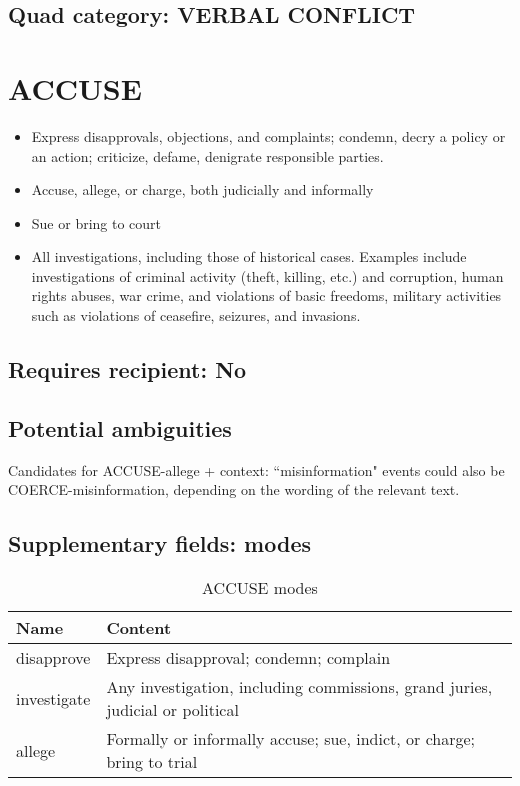 \documentclass[11pt]{report}
\newcommand{\plcat}[1]{\textsf{#1}}
\begin{document}
\subsection{Quad category: VERBAL CONFLICT}

\newpage


\section{ACCUSE}

\begin{itemize}
	\item Express disapprovals, objections, and complaints; condemn, decry a policy or an action; criticize, defame, denigrate responsible parties.
	\item Accuse, allege, or charge, both judicially and informally
	\item Sue or bring to court
	\item All investigations, including those of historical cases. Examples include investigations of  criminal activity (theft, killing, etc.) and corruption, human rights abuses, war crime, and violations of basic freedoms, military activities such as violations of ceasefire, seizures, and invasions.
\end{itemize}


\subsection{Requires recipient: No}

\subsection{Potential ambiguities}

Candidates for \plcat{ACCUSE}-allege + context: ``misinformation" events could also be \plcat{COERCE}-misinformation, depending on the wording of the relevant text.

\subsection{Supplementary fields: modes}

\begin{table}[htp]
\caption{\plcat{ACCUSE} modes}
\begin{center}
\begin{tabular}{|l|p{13cm}|}
\hline
Name & Content \\
\hline
disapprove & Express disapproval; condemn; complain\\
investigate & Any investigation, including commissions, grand juries, judicial or political\\
allege & Formally or informally accuse; sue, indict, or charge; bring to trial\\
\hline
\end{tabular}
\end{center}
\label{tab:accusemode}
\end{table}%
\end{document}
